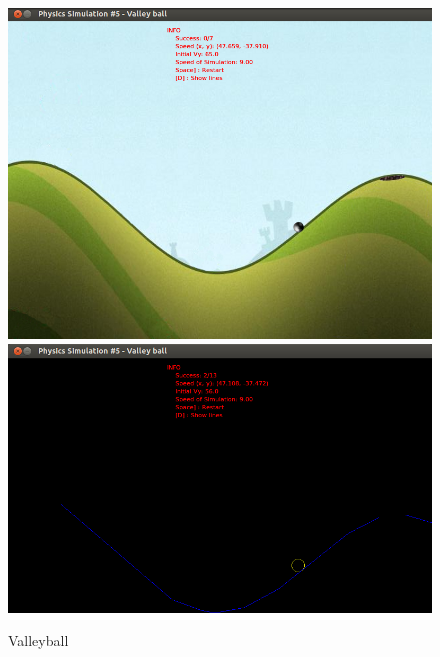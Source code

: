   \begin{figure}
	\centering
	\caption{Valleyball}
    \includegraphics[scale=0.4]{images/valleyball.png}
    \includegraphics[scale=0.4]{images/valleyballE.png}
  \end{figure}

